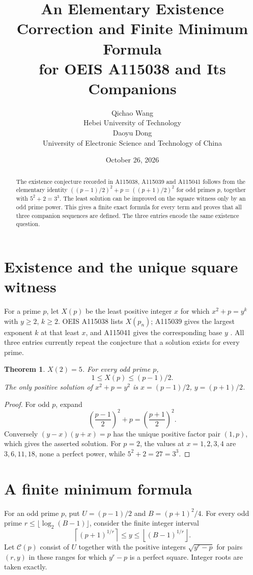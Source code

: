 \documentclass[10pt]{article}
\title{An Elementary Existence Correction and Finite Minimum Formula\\for OEIS A115038 and Its Companions}
\author{Qichao Wang\\{\small Hebei University of Technology}\\[0.3em]
Daoyu Dong\\{\small University of Electronic Science and Technology of China}}
\date{October 26, 2026}
\newtheorem{theorem}{Theorem}
\begin{document}
\maketitle
\begin{abstract}
The existence conjecture recorded in A115038, A115039 and A115041 follows
from the elementary identity $((p-1)/2)^2+p=((p+1)/2)^2$ for odd primes
$p$, together with $5^2+2=3^3$. The least solution can be improved on
the square witness only by an odd prime power. This gives a finite exact
formula for every term and proves that all three companion sequences
are defined. The three entries encode the same existence question.
\end{abstract}

\section{Existence and the unique square witness}
For a prime $p$, let $X(p)$ be the least positive integer $x$ for which
$x^2+p=y^k$ with $y\ge2$, $k\ge2$. OEIS A115038 lists $X(p_n)$;
A115039 gives the largest exponent $k$ at that least $x$, and A115041
gives the corresponding base $y$ \cite{oeis}. All three entries currently
repeat the conjecture that a solution exists for every prime.

\begin{theorem}\label{thm:exist}
$X(2)=5$. For every odd prime $p$,
\[
 1\le X(p)\le (p-1)/2.
\]
The only positive solution of $x^2+p=y^2$ is
$x=(p-1)/2$, $y=(p+1)/2$.
\end{theorem}
\begin{proof}
For odd $p$, expand
\[
 \left(\frac{p-1}{2}\right)^2+p=
 \left(\frac{p+1}{2}\right)^2.
\]
Conversely $(y-x)(y+x)=p$ has the unique positive factor pair $(1,p)$,
which gives the asserted solution. For $p=2$, the values at $x=1,2,3,4$
are $3,6,11,18$, none a perfect power, while $5^2+2=27=3^3$.
\end{proof}

\newpage
\section{A finite minimum formula}
For an odd prime $p$, put $U=(p-1)/2$ and $B=(p+1)^2/4$.
For every odd prime $r\le\lfloor\log_2(B-1)\rfloor$, consider the finite
integer interval
\begin{equation}\label{eq:y}
 \left\lceil(p+1)^{1/r}\right\rceil
 \le y\le\left\lfloor(B-1)^{1/r}\right\rfloor.
\end{equation}
Let $\mathcal C(p)$ consist of $U$ together with the positive integers
$\sqrt{y^r-p}$ for pairs $(r,y)$ in these ranges for which $y^r-p$ is
a perfect square. Integer roots are taken exactly.
\end{document}
